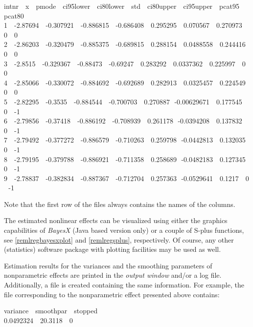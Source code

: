 \footnotesize
 intnr \,\, x \,\, pmode \,\, ci95lower \,\, ci80lower \,\, std \,\, ci80upper \,\, ci95upper \,\, pcat95 \,\, pcat80\\
 1 \,\, -2.87694 \,\, -0.307921 \,\, -0.886815 \,\, -0.686408 \,\, 0.295295 \,\, 0.070567   \,\, 0.270973 \,\, 0 \,\, 0\\
 2 \,\, -2.86203 \,\, -0.320479 \,\, -0.885375 \,\, -0.689815 \,\, 0.288154 \,\, 0.0488558  \,\, 0.244416 \,\, 0 \,\, 0\\
 3 \,\, -2.8515  \,\, -0.329367 \,\, -0.88473  \,\, -0.69247  \,\, 0.283292 \,\, 0.0337362  \,\, 0.225997 \,\, 0 \,\, 0\\
 4 \,\, -2.85066 \,\, -0.330072 \,\, -0.884692 \,\, -0.692689 \,\, 0.282913 \,\, 0.0325457  \,\, 0.224549 \,\, 0 \,\, 0\\
 5 \,\, -2.82295 \,\, -0.3535   \,\, -0.884544 \,\, -0.700703 \,\, 0.270887 \,\,-0.00629671 \,\, 0.177545 \,\, 0 \,\, -1\\
 6 \,\, -2.79856 \,\, -0.37418  \,\, -0.886192 \,\, -0.708939 \,\, 0.261178 \,\,-0.0394208  \,\, 0.137832 \,\, 0 \,\, -1\\
 7 \,\, -2.79492 \,\, -0.377272 \,\, -0.886579 \,\, -0.710263 \,\, 0.259798 \,\,-0.0442813  \,\, 0.132035 \,\, 0 \,\, -1\\
 8 \,\, -2.79195 \,\, -0.379788 \,\, -0.886921 \,\, -0.711358 \,\, 0.258689 \,\,-0.0482183  \,\, 0.127345 \,\, 0 \,\, -1\\
 9 \,\, -2.78837 \,\, -0.382834 \,\, -0.887367 \,\, -0.712704 \,\, 0.257363 \,\,-0.0529641  \,\, 0.1217   \,\, 0 \,\, -1
\normalsize

Note that the first row of the files always contains the names of
the columns.

The estimated nonlinear effects can be visualized using either the
graphics capabilities of {\em BayesX} (Java based version only) or a
couple of S-plus functions,  see \autoref{remlregbayesxplot} and
\autoref{remlregsplus}, respectively. Of course, any other
(statistics) software package with plotting facilities may be used
as well.

Estimation results for the variances and the smoothing parameters
of nonparametric effects are printed in the {\em output window}
and/or a log file. Additionally, a file is created containing the
same information. For example, the file corresponding to the
nonparametric effect presented above contains:

\footnotesize
 variance \,\, smoothpar \,\, stopped\\
 0.0492324 \,\, 20.3118 \,\, 0
\normalsize

